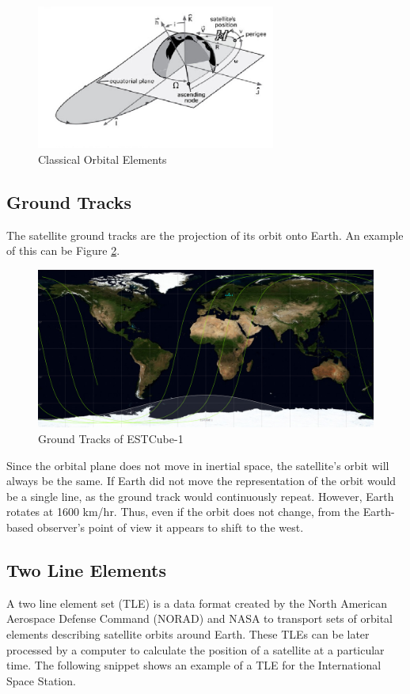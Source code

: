 \begin{figure}[H]
\centerline{\includegraphics[width=0.7\textwidth]{images/COEs.png}}
\caption{Classical Orbital Elements \cite{IntAstr}}
\label{f2.3}
\end{figure}
\pagebreak
\subsection{Ground Tracks}\label{2.3}

The satellite ground tracks are the projection of its orbit onto Earth. An example of this can be Figure \ref{f2.4}.

\begin{figure}[H]
\centerline{\includegraphics[width=1\textwidth]{images/GroundTracks.png}}
\caption{Ground Tracks of ESTCube-1}
\label{f2.4}
\end{figure}

Since the orbital plane does not move in inertial space, the satellite's orbit will always be the same. If Earth did not move the representation of the orbit would be a single line, as the ground track would continuously repeat. However, Earth rotates at 1600 km/hr. Thus, even if the orbit does not change, from the Earth-based observer's point of view it appears to shift to the west.

\subsection{Two Line Elements}\label{2.4}
A two line element set (TLE) is a data format created by the North American Aerospace Defense Command (NORAD) and NASA to transport sets of orbital elements describing satellite orbits around Earth. These TLEs can be later processed by a computer to calculate the position of a satellite at a particular time.
\newpage
The following snippet shows an example of a TLE for the International Space Station.

